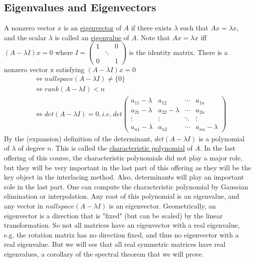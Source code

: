 \documentclass[11pt,a4paper]{report}
\theoremstyle{theoremdd}
\theoremstyle{claims1}
\theoremstyle{proofs1}
\begin{document}
\subsection{Eigenvalues and Eigenvectors}
A nonzero vector $x$ is an \underline{eigenvector} of $A$ if there exists $\lambda$ such that $Ax=\lambda x$, and the scalar $\lambda$ is called an \underline{eigenvalue} of $A$.
\newline Note that $Ax=\lambda x$ iff $(A-\lambda I)x = 0$ where $I = \begin{pmatrix}1 & & 0 \\ & \ddots & \\ 0 & & 1 \end{pmatrix}$ is the identity matrix.
\newline There is a nonzero vector x satisfying $(A-\lambda I)x = 0$
\begin{align*}
&\iff nullspace(A-\lambda I)\ne \{0\} \\
& \iff rank(A-\lambda I) < n \\
& \iff det(A-\lambda I)=0, 
i.e. \ det\begin{pmatrix}
a_{11}-\lambda & a_{12} & \cdots & a_{1n} \\
a_{21}-\lambda & a_{22}-\lambda & \cdots & a_{2n} \\
\vdots & \vdots & \ddots & \vdots \\
a_{n1}-\lambda & a_{n2} & \cdots & a_{nn}-\lambda
\end{pmatrix}
\end{align*}
By the (expansion) definition of the determinant, $det(A-\lambda I)$ is a polynomial of $\lambda$ of degree $n$.
\newline This is called the \underline{characteristic polynomial} of $A$.
\newline In the last offering of this course, the characteristic polynomials did not play a major role, but they will be very important in the last part of this offering as they will be the key object in the interlacing method. Also, determinants will play an important role in the last part.
\newline\newline One can compute the characteristic polynomial by Gaussian elimination or interpolation.
\newline Any root of this polynomial is an eigenvalue, and any vector in $nullspace(A-\lambda I)$ is an eigenvector.
\newline Geometrically, an eigenvector is a direction that is "fixed" (but can be scaled) by the linear transformation.
\newline So not all matrices have an eigenvector with a real eigenvalue, e.g. the rotation matrix has no direction fixed, and thus no eigenvector with a real eigenvalue.
\newline But we will see that all real symmetric matrices have real eigenvalues, a corollary of the spectral theorem that we will prove.
\end{document}
